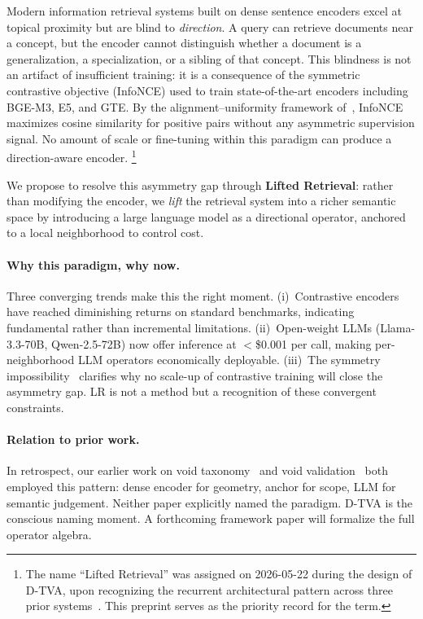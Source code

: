 \documentclass[twocolumn]{article}
\newcommand{\dtva}{\textsc{D-TVA}}
\newcommand{\lr}{\textsc{LR}}
\begin{document}
Modern information retrieval systems built on dense sentence encoders
excel at topical proximity but are blind to \emph{direction}.
A query can retrieve documents near a concept, but the encoder cannot
distinguish whether a document is a generalization, a specialization,
or a sibling of that concept.
This blindness is not an artifact of insufficient training: it is a
consequence of the symmetric contrastive objective (InfoNCE) used to
train state-of-the-art encoders including BGE-M3, E5, and GTE.
By the alignment--uniformity framework of~\citet{wang2020understanding},
InfoNCE maximizes cosine similarity for positive pairs without any
asymmetric supervision signal.
No amount of scale or fine-tuning within this paradigm can produce a
direction-aware encoder.%
\footnote{The name ``Lifted Retrieval'' was assigned on 2026-05-22
during the design of \dtva{}, upon recognizing the recurrent
architectural pattern across three prior systems~\cite{pan2026tva,
pan2026tvv}. This preprint serves as the priority record for the term.}

We propose to resolve this asymmetry gap through \textbf{Lifted Retrieval}:
rather than modifying the encoder, we \emph{lift} the retrieval system
into a richer semantic space by introducing a large language model as a
directional operator, anchored to a local neighborhood to control cost.

\paragraph{Why this paradigm, why now.}
Three converging trends make this the right moment.
(i)~Contrastive encoders have reached diminishing returns on standard
benchmarks, indicating fundamental rather than incremental limitations.
(ii)~Open-weight LLMs (Llama-3.3-70B, Qwen-2.5-72B) now offer
inference at $<$\$0.001 per call, making per-neighborhood LLM operators
economically deployable.
(iii)~The symmetry impossibility~\cite{wang2020understanding} clarifies
why no scale-up of contrastive training will close the asymmetry gap.
\lr{} is not a method but a recognition of these convergent constraints.

\paragraph{Relation to prior work.}
In retrospect, our earlier work on void taxonomy~\cite{pan2026tva} and
void validation~\cite{pan2026tvv} both employed this pattern: dense
encoder for geometry, anchor for scope, LLM for semantic judgement.
Neither paper explicitly named the paradigm.
\dtva{} is the conscious naming moment.
A forthcoming framework paper will formalize the full operator algebra.
\end{document}

